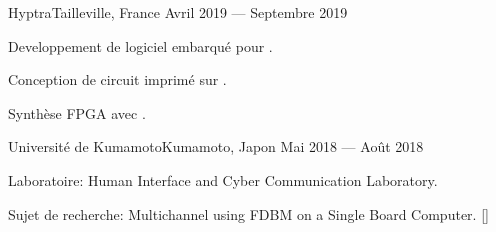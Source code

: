 
    {Hyptra}{Tailleville, France}
    {Avril 2019 --- Septembre 2019}
    {%
        \begin{additems}
            \item Developpement de logiciel embarqué pour .
            \item Conception de circuit imprimé sur .
            \item Synthèse FPGA avec .
        \end{additems}
    }

    {Université de Kumamoto}{Kumamoto, Japon}
    {Mai 2018 --- Ao\^ut 2018}
    {%
        \begin{additems}
            \item Laboratoire: Human Interface and Cyber Communication Laboratory.
            \item Sujet de recherche: Multichannel  using FDBM on a Single Board Computer. []
        \end{additems}
    }

